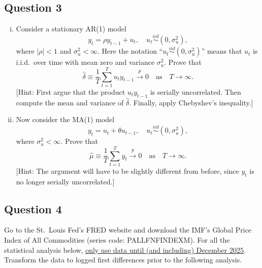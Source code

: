 \documentclass[12pt]{article}
\theoremstyle{plain}
\begin{document}

\subsection*{Question 3}
\begin{enumerate}[i)]
\item Consider a stationary AR(1) model
\[y_t = \rho y_{t-1} + u_t,\quad u_t \overset{iid}{\sim} (0,\sigma_u^2),\]
where $|\rho|<1$ and $\sigma_u^2 < \infty$. Here the notation ``$u_t \overset{iid}{\sim} (0,\sigma_u^2)$'' means that $u_t$ is i.i.d.\ over time with mean zero and variance $\sigma_u^2$. Prove that
\[\hat{\delta} \equiv \frac{1}{T}\sum_{t=1}^T u_t y_{t-1} \overset{p}{\to} 0\quad \text{as} \quad T\to\infty.\]
[Hint: First argue that the product $u_t y_{t-1}$ is serially uncorrelated. Then compute the mean and variance of $\hat{\delta}$. Finally, apply Chebyshev's inequality.]
\item Now consider the MA(1) model
\[y_t = u_t + \theta u_{t-1},\quad u_t \overset{iid}{\sim} (0,\sigma_u^2),\]
where $\sigma_u^2<\infty$. Prove that
\[\hat{\mu} \equiv \frac{1}{T}\sum_{t=1}^T y_t \overset{p}{\to} 0\quad \text{as} \quad T\to\infty.\]
[Hint: The argument will have to be slightly different from before, since $y_t$ is no longer serially uncorrelated.]
\end{enumerate}

\subsection*{Question 4}
Go to the St.\ Louis Fed's FRED website and download the IMF's Global Price Index of All Commodities (series code: PALLFNFINDEXM). For all the statistical analysis below, \underline{only use data until (and including) December 2025}. Transform the data to logged first differences prior to the following analysis.
\end{document}
